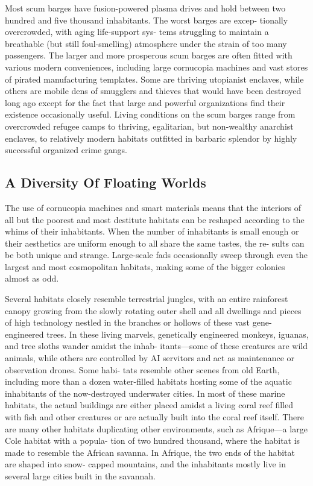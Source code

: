 Most scum barges have fusion-powered plasma 
drives and hold between two hundred and five 
thousand inhabitants. The worst barges are excep-
tionally overcrowded, with aging life-support sys-
tems struggling to maintain a breathable (but still 
foul-smelling) atmosphere under the strain of too 
many passengers. The larger and more prosperous 
scum barges are often fitted with various modern 
conveniences, including large cornucopia machines 
and vast stores of pirated manufacturing templates. 
Some are thriving utopianist enclaves, while others 
are mobile dens of smugglers and thieves that would 
have been destroyed long ago except for the fact that 
large and powerful organizations find their existence 
occasionally useful. Living conditions on the scum 
barges range from overcrowded refugee camps to 
thriving, egalitarian, but non-wealthy anarchist 
enclaves, to relatively modern habitats outfitted in 
barbaric splendor by highly successful organized 
crime gangs.

\subsection{A Diversity Of Floating Worlds}

The use of cornucopia machines and smart materials 
means that the interiors of all but the poorest and 
most destitute habitats can be reshaped according 
to the whims of their inhabitants. When the number 
of inhabitants is small enough or their aesthetics are 
uniform enough to all share the same tastes, the re-
sults can be both unique and strange. Large-scale fads 
occasionally sweep through even the largest and most 
cosmopolitan habitats, making some of the bigger 
colonies almost as odd.

Several habitats closely resemble terrestrial jungles, 
with an entire rainforest canopy growing from the 
slowly rotating outer shell and all dwellings and 
pieces of high technology nestled in the branches 
or hollows of these vast gene-engineered trees. In 
these living marvels, genetically engineered monkeys, 
iguanas, and tree sloths wander amidst the inhab-
itants—some of these creatures are wild animals, 
while others are controlled by AI servitors and act 
as maintenance or observation drones. Some habi-
tats resemble other scenes from old Earth, including 
more than a dozen water-filled habitats hosting some 
of the aquatic inhabitants of the now-destroyed 
underwater cities. In most of these marine habitats, 
the actual buildings are either placed amidst a living 
coral reef filled with fish and other creatures or are 
actually built into the coral reef itself. There are 
many other habitats duplicating other environments, 
such as Afrique—a large Cole habitat with a popula-
tion of two hundred thousand, where the habitat is 
made to resemble the African savanna. In Afrique, 
the two ends of the habitat are shaped into snow-
capped mountains, and the inhabitants mostly live in 
several large cities built in the savannah.

